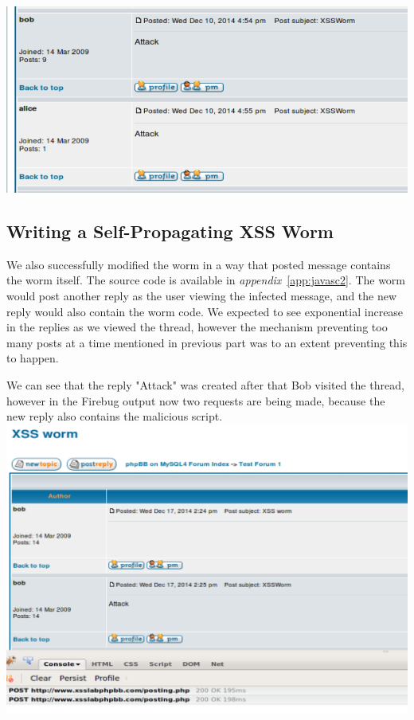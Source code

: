 \documentclass[12pt, a4paper]{article}
\begin{document}
\includegraphics[width=.95\textwidth]{gfx/xss/task5-worm-working}

\subsection{Writing a Self-Propagating XSS Worm}
We also successfully modified the worm in a way that posted message contains the worm itself. The source code is available in \emph{appendix}~\ref{app:javasc2}.
The worm would post another reply as the user viewing the infected message, and the new reply would also contain the worm code. We expected to see exponential increase in the replies as we viewed the thread, however the mechanism preventing too many posts at a time mentioned in previous part was to an extent preventing this to happen.

We can see that the reply "Attack" was created after that Bob visited the thread, however in the Firebug output now two requests are being made, because the new reply also contains the malicious script.\\
\includegraphics[width=.95\textwidth]{gfx/xss/task6}
\end{document}
